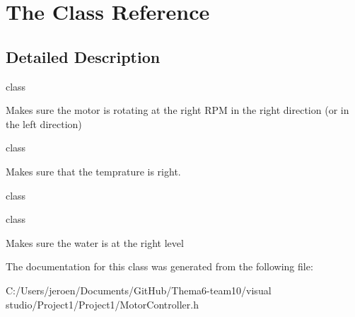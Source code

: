 \hypertarget{class_the}{}\section{The Class Reference}
\label{class_the}


\subsection{Detailed Description}
class

Makes sure the motor is rotating at the right R\+PM in the right direction (or in the left direction)

class

Makes sure that the temprature is right.

class

class

Makes sure the water is at the right level 

The documentation for this class was generated from the following file\+:\begin{DoxyCompactItemize}
\item 
C\+:/\+Users/jeroen/\+Documents/\+Git\+Hub/\+Thema6-\/team10/visual studio/\+Project1/\+Project1/Motor\+Controller.\+h\end{DoxyCompactItemize}
